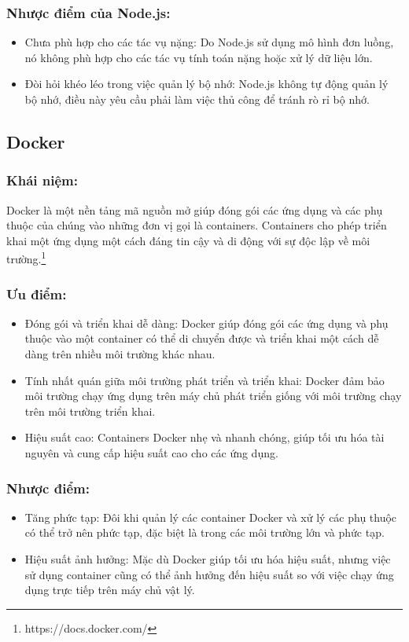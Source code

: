 \subsubsection{Nhược điểm của Node.js:}
\begin{itemize}
    \item Chưa phù hợp cho các tác vụ nặng: Do Node.js sử dụng mô hình đơn luồng, nó không phù hợp cho các tác vụ tính toán nặng hoặc xử lý dữ liệu lớn.
    \item Đòi hỏi khéo léo trong việc quản lý bộ nhớ: Node.js không tự động quản lý bộ nhớ, điều này yêu cầu phải làm việc thủ công để tránh rò rỉ bộ nhớ.
\end{itemize}
\subsection{Docker}
\subsubsection{Khái niệm:}
\indent Docker là một nền tảng mã nguồn mở giúp đóng gói các ứng dụng và các phụ thuộc của chúng vào những đơn vị gọi là containers. Containers cho phép triển khai một ứng dụng một cách đáng tin cậy và di động với sự độc lập về môi trường.\footnote{https://docs.docker.com/}
\subsubsection{Ưu điểm:}
\begin{itemize}
    \item Đóng gói và triển khai dễ dàng: Docker giúp đóng gói các ứng dụng và phụ thuộc vào một container có thể di chuyển được và triển khai một cách dễ dàng trên nhiều môi trường khác nhau.
    \item Tính nhất quán giữa môi trường phát triển và triển khai: Docker đảm bảo môi trường chạy ứng dụng trên máy chủ phát triển giống với môi trường chạy trên môi trường triển khai.
    \item Hiệu suất cao: Containers Docker nhẹ và nhanh chóng, giúp tối ưu hóa tài nguyên và cung cấp hiệu suất cao cho các ứng dụng.
\end{itemize}
\subsubsection{Nhược điểm:}
\begin{itemize}
    \item Tăng phức tạp: Đôi khi quản lý các container Docker và xử lý các phụ thuộc có thể trở nên phức tạp, đặc biệt là trong các môi trường lớn và phức tạp.
    \item Hiệu suất ảnh hưởng: Mặc dù Docker giúp tối ưu hóa hiệu suất, nhưng việc sử dụng container cũng có thể ảnh hưởng đến hiệu suất so với việc chạy ứng dụng trực tiếp trên máy chủ vật lý.
\end{itemize}

